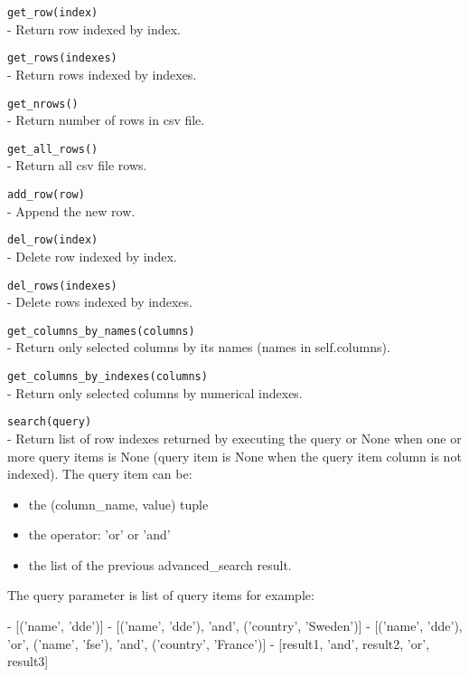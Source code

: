 \documentclass[a4paper]{book}
\begin{document}
\begin{api}
  {\tt get\_row(index)}\\
  - Return row indexed by index.

  {\tt get\_rows(indexes)}\\
  - Return rows indexed by indexes.

  {\tt get\_nrows()}\\
  - Return number of rows in csv file.

  {\tt get\_all\_rows()}\\
  - Return all csv file rows.

  {\tt add\_row(row)}\\
  - Append the new row.

  {\tt del\_row(index)}\\
  - Delete row indexed by index.

  {\tt del\_rows(indexes)}\\
  - Delete rows indexed by indexes.

  {\tt get\_columns\_by\_names(columns)}\\
  - Return only selected columns by its names (names in self.columns).

  {\tt get\_columns\_by\_indexes(columns)}\\
  - Return only selected columns by numerical indexes.

  {\tt search(query)}\\
  - Return list of row indexes returned by executing the query
    or None when one or more query items is None (query item
    is None when the query item column is not indexed).
    The query item can be: 
    \begin{itemize}
        \item the (column\_name, value) tuple 
        \item the operator:  'or' or 'and'
        \item the list of the previous advanced\_search result.
    \end{itemize}
    
    The query parameter is list of query items for example:
    \begin{code}
    - [('name', 'dde')]
    - [('name', 'dde'), 'and', ('country', 'Sweden')]
    - [('name', 'dde'), 'or', ('name', 'fse'), 
       'and', ('country', 'France')]
    - [result1, 'and', result2, 'or', result3]
    \end{code}
\end{api}
\end{document}
